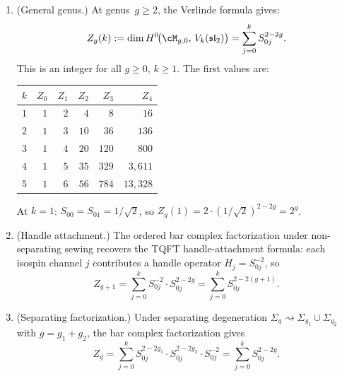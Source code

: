 \begin{proposition}
\begin{enumerate}[label=\textup{(\roman*)}]
\item \textup{(General genus.)}
  At genus~$g \geq 2$, the Verlinde formula gives:
  \begin{equation}\label{eq:verlinde-general}
    Z_g(k) := \dim H^0\!\bigl(\cM_{g,0},\,
    V_k(\mathfrak{sl}_2)\bigr)
    = \sum_{j=0}^{k} S_{0j}^{2-2g}.
  \end{equation}
  This is an integer for all $g \geq 0$, $k \geq 1$.
  The first values are:
  \begin{center}
  \renewcommand{\arraystretch}{1.3}
  \begin{tabular}{@{} c r r r r r @{}}
  \toprule
  $k$ & $Z_0$ & $Z_1$ & $Z_2$ & $Z_3$ & $Z_4$ \\
  \midrule
  $1$ & $1$ & $2$ & $4$ & $8$ & $16$ \\
  $2$ & $1$ & $3$ & $10$ & $36$ & $136$ \\
  $3$ & $1$ & $4$ & $20$ & $120$ & $800$ \\
  $4$ & $1$ & $5$ & $35$ & $329$ & $3{,}611$ \\
  $5$ & $1$ & $6$ & $56$ & $784$ & $13{,}328$ \\
  \bottomrule
  \end{tabular}
  \end{center}
  At $k = 1$: $S_{00} = S_{01} = 1/\sqrt{2}$, so
  $Z_g(1) = 2 \cdot (1/\sqrt{2})^{2-2g} = 2^g$.

\item \textup{(Handle attachment.)}
  The ordered bar complex factorization under non-separating
  sewing recovers the TQFT handle-attachment formula:
  each isospin channel $j$ contributes a handle operator
  $H_j = S_{0j}^{-2}$, so
  \begin{equation}\label{eq:handle-attachment}
    Z_{g+1}
    = \sum_{j=0}^{k} S_{0j}^{-2} \cdot S_{0j}^{2-2g}
    = \sum_{j=0}^{k} S_{0j}^{2-2(g+1)}.
  \end{equation}

\item \textup{(Separating factorization.)}
  Under separating degeneration $\Sigma_g \rightsquigarrow
  \Sigma_{g_1} \cup \Sigma_{g_2}$ with $g = g_1 + g_2$,
  the bar complex factorization gives
  \begin{equation}\label{eq:sep-factorization}
    Z_g
    = \sum_{j=0}^{k} S_{0j}^{2-2g_1} \cdot S_{0j}^{2-2g_2}
    \cdot S_{0j}^{-2}
    = \sum_{j=0}^{k} S_{0j}^{2-2g}.
  \end{equation}
\end{enumerate}
\end{proposition}

